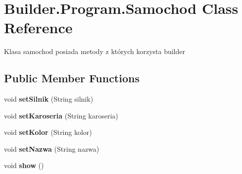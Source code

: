 \hypertarget{class_builder_1_1_program_1_1_samochod}{}\section{Builder.\+Program.\+Samochod Class Reference}
\label{class_builder_1_1_program_1_1_samochod}


Klasa samochod posiada metody z których korzysta builder  


\subsection*{Public Member Functions}
\begin{DoxyCompactItemize}
\item 
\mbox{\label{class_builder_1_1_program_1_1_samochod_af4d2eb9e389cfebc9170e7c079bc944d}} 
void {\bfseries set\+Silnik} (String silnik)
\item 
\mbox{\label{class_builder_1_1_program_1_1_samochod_a284af3a9af1625ea7096fe9201772726}} 
void {\bfseries set\+Karoseria} (String karoseria)
\item 
\mbox{\label{class_builder_1_1_program_1_1_samochod_a37ea3ffe0420269c297b6629c98cad4d}} 
void {\bfseries set\+Kolor} (String kolor)
\item 
\mbox{\label{class_builder_1_1_program_1_1_samochod_ae51c9e19c0d6dd0121e0d2c376ce50a5}} 
void {\bfseries set\+Nazwa} (String nazwa)
\item 
\mbox{\label{class_builder_1_1_program_1_1_samochod_a672fa98295ff4dd32320f42feda2420c}} 
void {\bfseries show} ()
\end{DoxyCompactItemize}
